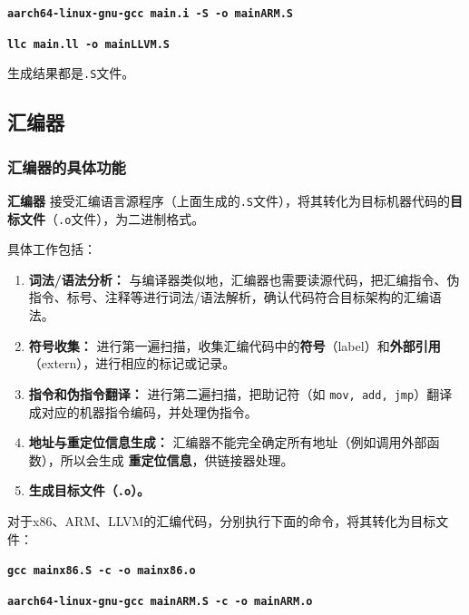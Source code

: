 \documentclass[UTF8,a4paper,10pt]{ctexart}
\begin{document}
\begin{center}
    \textcolor{deepblue}{\textbf{\texttt{\large{aarch64-linux-gnu-gcc main.i -S -o mainARM.S}}}}
\end{center}

\begin{center}
    \textcolor{deepblue}{\textbf{\texttt{\large{llc main.ll -o mainLLVM.S}}}}
\end{center}

生成结果都是\texttt{.S}文件。

\vspace{1em}

\subsection{汇编器}
\subsubsection{汇编器的具体功能}
\textbf{汇编器} 接受汇编语言源程序（上面生成的\texttt{.S}文件），将其转化为目标机器代码的\textbf{目标文件}（\texttt{.o}文件），为二进制格式。

具体工作包括：
\begin{enumerate}
    \item \textbf{词法/语法分析：} 与编译器类似地，汇编器也需要读源代码，把汇编指令、伪指令、标号、注释等进行词法/语法解析，确认代码符合目标架构的汇编语法。
    \item \textbf{符号收集：} 进行第一遍扫描，收集汇编代码中的\textbf{符号}（label）和\textbf{外部引用}（extern），进行相应的标记或记录。
    \item \textbf{指令和伪指令翻译：} 进行第二遍扫描，把助记符（如 \texttt{mov, add, jmp}）翻译成对应的机器指令编码，并处理伪指令。
    \item \textbf{地址与重定位信息生成：} 汇编器不能完全确定所有地址（例如调用外部函数），所以会生成 \textbf{重定位信息}，供链接器处理。
    \item \textbf{生成目标文件（\texttt{.o}）。}
\end{enumerate}

对于x86、ARM、LLVM的汇编代码，分别执行下面的命令，将其转化为目标文件：
\begin{center}
    \textcolor{deepblue}{\textbf{\texttt{\large{gcc mainx86.S -c -o mainx86.o}}}}
\end{center}

\begin{center}
    \textcolor{deepblue}{\textbf{\texttt{\large{aarch64-linux-gnu-gcc mainARM.S -c -o mainARM.o}}}}
\end{center}
\end{document}
